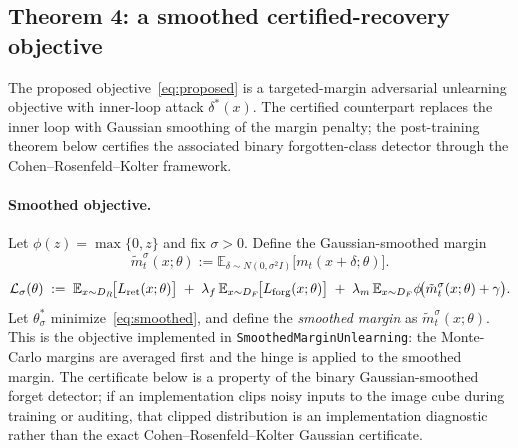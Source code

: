 \subsection{Theorem 4: a smoothed certified-recovery objective}
\label{sec:thm4}

The proposed objective~\eqref{eq:proposed} is a targeted-margin adversarial
unlearning objective with inner-loop attack $\delta^*(x)$. The certified
counterpart replaces the inner loop with Gaussian smoothing of the margin
penalty; the post-training theorem below certifies the associated binary
forgotten-class detector through the Cohen--Rosenfeld--Kolter framework.

\paragraph{Smoothed objective.} Let $\phi(z) = \max\{0, z\}$ and fix
$\sigma > 0$. Define the Gaussian-smoothed margin
\[
  \tilde m_t^\sigma(x;\theta)
  :=
  \mathbb{E}_{\delta \sim N(0,\sigma^2 I)}
  \bigl[m_t(x+\delta;\theta)\bigr].
\]
\begin{equation}
  \mathcal{L}_\sigma(\theta) \;:=\;
  \mathbb{E}_{x \sim D_R}\!\bigl[L_{\rm ret}(x;\theta)\bigr] \;+\;
  \lambda_f\, \mathbb{E}_{x \sim D_F}\!\bigl[L_{\rm forg}(x;\theta)\bigr]
  \;+\; \lambda_m \,
  \mathbb{E}_{x \sim D_F}
  \phi\!\bigl(\tilde m_t^\sigma(x;\theta) + \gamma\bigr).
  \label{eq:smoothed}
\end{equation}
Let $\theta_\sigma^*$ minimize~\eqref{eq:smoothed}, and define the
\emph{smoothed margin} as $\tilde m_t^\sigma(x;\theta)$. This is the objective
implemented in \texttt{SmoothedMarginUnlearning}: the Monte-Carlo margins are
averaged first and the hinge is applied to the smoothed margin. The certificate
below is a property of the binary Gaussian-smoothed forget detector; if an
implementation clips noisy inputs to the image cube during training or auditing,
that clipped distribution is an implementation diagnostic rather than the exact
Cohen--Rosenfeld--Kolter Gaussian certificate.

